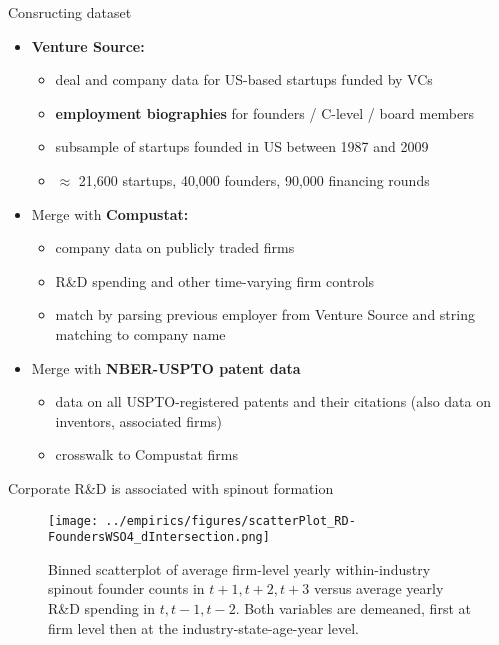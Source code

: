 \documentclass[english,usenames,dvipsnames]{beamer}
\begin{document}
\begin{frame}{Consructing dataset}\label{empirics:constructing_dataset}
	\begin{itemize}
		\item<+-> \alert{\textbf{Venture Source:}} 
		\begin{itemize}
			\item deal and company data for US-based startups funded by VCs
			\item \alert{\textbf{employment biographies}} for founders / C-level / board members
			\item subsample of startups founded in US between 1987 and 2009
			\item $\approx$ 21,600 startups, 40,000 founders, 90,000 financing rounds
		\end{itemize}
		\medskip
		\item<+-> Merge with \alert{\textbf{Compustat:}}
		\begin{itemize}
			\item company data on publicly traded firms 
			\item R\&D spending and other time-varying firm controls
			\item match by parsing previous employer from Venture Source and string matching to company name \hyperlink{empirics:wso_heatmap}{}
		\end{itemize}
		\medskip
		\item<+-> Merge with \alert{\textbf{NBER-USPTO patent data}}
		\begin{itemize}
			\item data on all USPTO-registered patents and their citations (also data on inventors, associated firms)
			\item crosswalk to Compustat firms
		\end{itemize}
	\end{itemize}
\end{frame}

\begin{frame}{Corporate R\&D is associated with spinout formation}\label{empirics:scatterplot}
	\begin{figure}[!htb]
		\centering
		\texttt{[image: ../empirics/figures/scatterPlot\_RD-FoundersWSO4\_dIntersection.png]}
		\caption{\footnotesize Binned scatterplot of average firm-level yearly within-industry spinout founder counts in $t+1,t+2,t+3$ versus average yearly R\&D spending in $t,t-1,t-2$. Both variables are demeaned, first at firm level then at the industry-state-age-year level.}
	\end{figure}
\end{frame}
\end{document}

